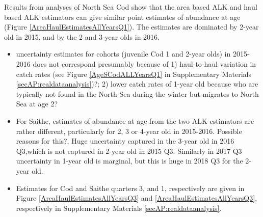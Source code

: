 \documentclass[a4paper 12pt]{article}
\numberwithin{equation}{section}
\begin{document}
Results from analyses of North Sea Cod  show that the area based ALK and haul based ALK estimators can give similar point estimates of abundance at age (Figure \ref{AreaHaulEstimatesAllYearsQ1}). The estimates are dominated by 2-year old in 2015, and by the 2 and 3-year olds in 2016. 
\begin{itemize}
\item uncertainty estimates for cohorts (juvenile Cod 1 and 2-year olds) in  2015-2016 does not correspond presumably because of 1) haul-to-haul variation in catch rates (see Figure \ref{AgeSCodALLYearsQ1} in Supplementary Materials \ref{secAP:realdataanalysis})?; 2) lower catch rates of 1-year old because who are typically not found in the North Sea during the winter but migrates to North Sea at age 2?
\item For Saithe, estimates of abundance at age from the two ALK estimators are rather different, particularly for 2, 3 or 4-year old in 2015-2016. Possible reasons for this?. Huge uncertainty captured in the 3-year old in 2016 Q3,which is not captured in 2-year old in 2015 Q3. Similarly in 2017 Q3 uncertainty in 1-year old is marginal, but this is huge in 2018 Q3 for the 2-year old.
\item  Estimates for Cod and Saithe quarters 3, and 1, respectively are given in Figure \ref{AreaHaulEstimatesAllYearsQ3} and \ref{AreaHaulEstimatesAllYearsQ3}, respectively in Supplementary Materials \ref{secAP:realdataanalysis}.
\end{itemize}






\end{document}
